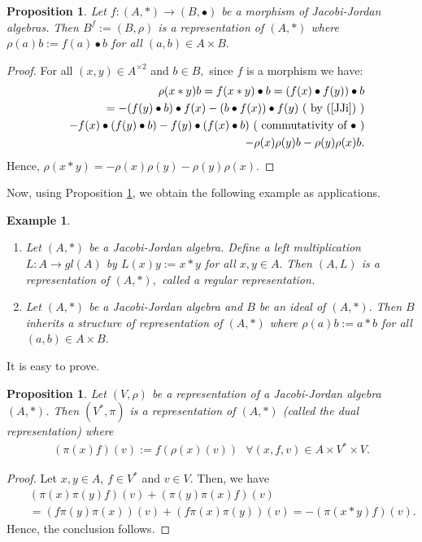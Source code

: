 \documentclass[12pt]{amsart}
\newtheorem{example}[Theorem]{Example}
\newtheorem{proposition}[Theorem]{Proposition}
\begin{document}
	\begin{proposition}\label{PEx0}
		Let  $f:(A, \ast)\rightarrow (B, \bullet)$ be a morphism of Jacobi-Jordan algebras. Then $B^f:=(B, \rho)$ is a representation of $(A,\ast)$ where
		$\rho(a)b:=f(a)\bullet b$ for all $(a,b)\in A\times B.$
	\end{proposition}
	\begin{proof}
		For all $(x,y)\in A^{\times 2}$ and $b\in B,$ since $f$ is a morphism we have:
		\begin{eqnarray}
			&&\rho(x\ast y)b=f(x\ast y)\bullet b=(f(x)\bullet f(y))\bullet b\nonumber\\
			&&=-(f(y)\bullet b)\bullet f(x)-(b\bullet f(x))\bullet f(y) \mbox{ ( by (\ref{JJi}) )}\nonumber\\
			&&-f(x)\bullet(f(y)\bullet b)-f(y)\bullet(f(x)\bullet b) \mbox{ ( commutativity of $\bullet$ )}\nonumber\\
			&&-\rho(x)\rho(y)b-\rho(y)\rho(x)b.\nonumber
		\end{eqnarray}
		Hence, $\rho(x\ast y)=-\rho(x)\rho(y)-\rho(y)\rho(x).$
	\end{proof}
	Now, using Proposition \ref{PEx0}, we obtain the following example as applications.
	\begin{example}
		\begin{enumerate}
			\item Let $(A,\ast)$ be a Jacobi-Jordan algebra. Define a left multiplication 
			$ L: A\rightarrow gl(A)$  by $L(x)y:=x\ast y$  for all $x, y \in A.$ Then $(A , L)$ is a representation of $(A, \ast),$  called a regular representation.
			\item Let $(A,\ast)$ be a Jacobi-Jordan algebra and $B$ be an ideal of $(A,\ast).$ Then $B$  inherits a structure of representation of $(A,\ast)$ where 
			$\rho(a)b:=a\ast b$ for all $(a,b)\in A\times B.$
		\end{enumerate}
	\end{example}
	It is easy to prove.
	\begin{proposition}
		Let $(V,\rho)$	be a representation of a Jacobi-Jordan algebra $(A,\ast)$. Then $(V^{\ast},\pi)$ is a representation of $(A,\ast)$ (called the dual representation) where
		\begin{eqnarray}
			(\pi(x) f)(v):=f(\rho(x)(v)) \mbox{ $\forall (x,f,v)\in A\times V^{\ast}\times V$.}
		\end{eqnarray}
	\end{proposition}
	\begin{proof}
		Let $x,y\in A$, $f\in V^{\ast}$ and $v\in V.$ Then, we have
		\begin{eqnarray}
			&&(\pi(x)\pi(y)f)(v)+(\pi(y)\pi(x) f)(v)\nonumber\\
			&&=
			(f\pi(y)\pi(x))(v)+(f\pi(x)\pi(y))(v)=
			-(\pi(x\ast y)f)(v).\nonumber
		\end{eqnarray}
		Hence, the conclusion follows.
	\end{proof}
\end{document}
